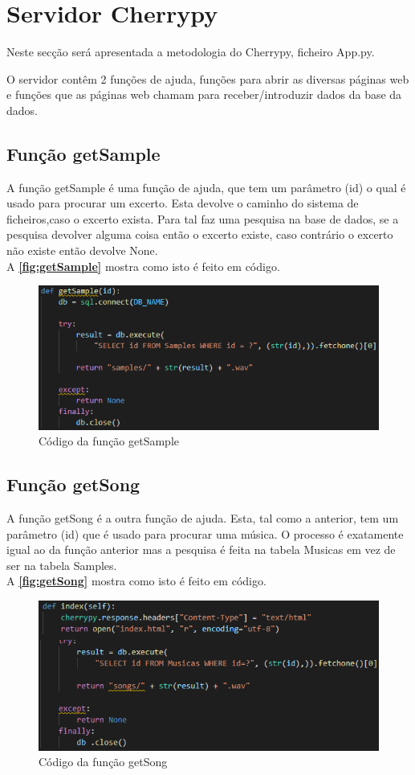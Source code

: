 \documentclass{report}
\begin{document}
\section{Servidor Cherrypy}
\label{sec:serCherrypy}
Neste secção será apresentada a metodologia do Cherrypy, ficheiro App.py.

O servidor contêm 2 funções de ajuda, funções para abrir as diversas páginas web e funções que as páginas web chamam para receber/introduzir dados da base da dados.
\subsection{Função getSample}
\label{ssec:getSample}
A função getSample é uma função de ajuda, que tem um parâmetro (id) o qual é usado para procurar um excerto.
Esta devolve o caminho do sistema de ficheiros,caso o excerto exista.
Para tal faz uma pesquisa na base de dados, se a pesquisa devolver alguma coisa então o excerto existe, caso contrário o excerto não existe então devolve None.\\
A \textbf{\autoref{fig:getSample}} mostra como isto é feito em código.

\begin{figure}[!h]
\center 
\includegraphics[width=330pt]{img/getSample.png}
\caption{Código da função getSample}
\label{fig:getSample}
\end{figure}

\subsection{Função getSong}
\label{ssec:getSong}
A função getSong é a outra função de ajuda.
Esta, tal como a anterior, tem um parâmetro (id) que é usado para procurar uma música.
O processo é exatamente igual ao da função anterior mas a pesquisa é feita na tabela Musicas em vez de ser na tabela Samples.\\
A \textbf{\autoref{fig:getSong}} mostra como isto é feito em código.
\begin{figure}[!h]
\center 
\includegraphics[width=330pt]{img/getSong.png}
\caption{Código da função getSong}
\label{fig:getSong}
\end{figure}
\end{document}

